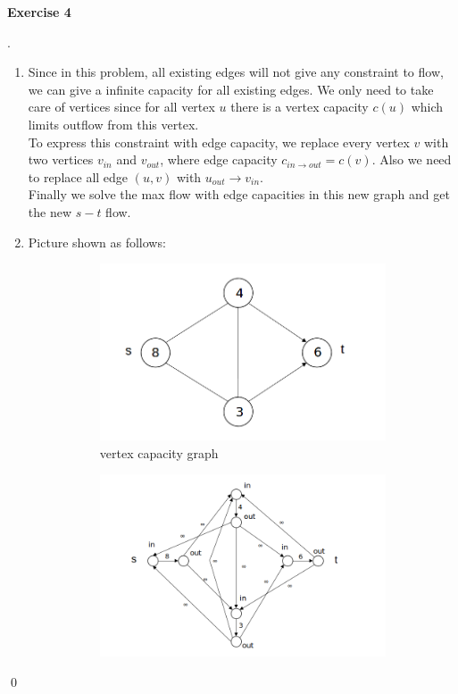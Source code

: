 \documentclass[12pt, notitlepage]{article}
\newenvironment{sol}
  {\par\vspace{3mm}\noindent{\it Solution}.}{\qed}
\begin{document}
\textbf{Exercise 4}
\begin{sol}
	\begin{enumerate}[1.]
		\item Since in this problem, all existing edges will not give any constraint to flow, we can give a infinite capacity for all existing edges. We only need to take care of vertices since for all vertex $u$ there is a vertex capacity $c(u)$ which limits outflow from this vertex.\\
			To express this constraint with edge capacity, we replace every vertex $v$ with two vertices $v_{in}$ and $v_{out}$, where edge capacity $c_{in\rightarrow out} = c(v)$. Also we need to replace all edge $(u, v)$ with $u_{out}\rightarrow v_{in}$.\\
			Finally we solve the max flow with edge capacities in this new graph and get the new $s-t$ flow.
	\item Picture shown as follows:
		\begin{figure}
			\centering
			\begin{subfigure}{.5\textwidth}
				\centering
				\includegraphics[width=0.8\linewidth]{dis1.png}
				\caption{vertex capacity graph}
			\end{subfigure}%
			\begin{subfigure}{.5\textwidth}
				\centering
				\includegraphics[width=1\linewidth]{dis2.png}

\end{subfigure}
\end{figure}
\end{enumerate}
\end{sol}
\end{document}
